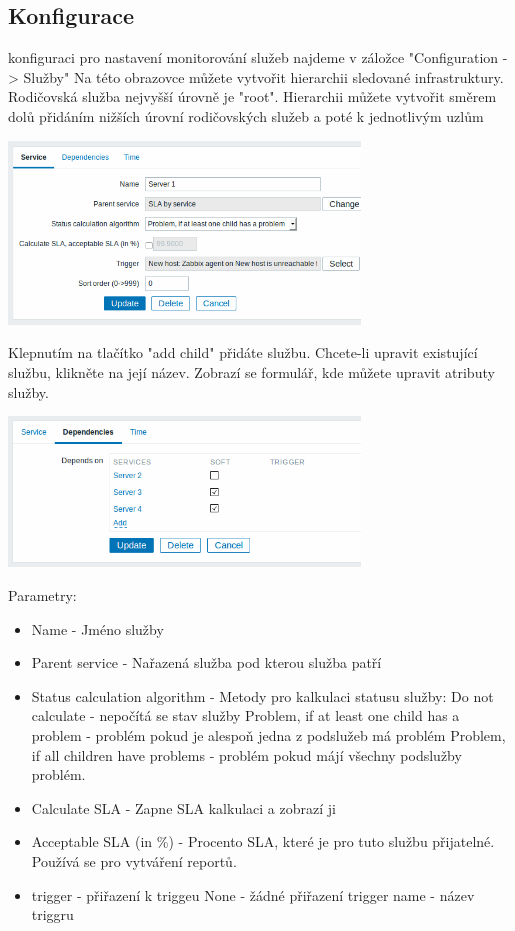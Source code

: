 \documentclass{article}
\begin{document}
\subsection{Konfigurace}
konfiguraci pro nastavení monitorování služeb najdeme v záložce "Configuration -> Služby"
Na této obrazovce můžete vytvořit hierarchii sledované infrastruktury. Rodičovská služba nejvyšší úrovně je "root". Hierarchii můžete vytvořit směrem dolů přidáním nižších úrovní rodičovských služeb a poté k jednotlivým uzlům
\begin{center}
        \includegraphics[width=0.7\textwidth]{obrazky/itservice.png}
\end{center}
Klepnutím na tlačítko "add child" přidáte službu. Chcete-li upravit existující službu, klikněte na její název. Zobrazí se formulář, kde můžete upravit atributy služby.
\begin{center}
        \includegraphics[width=0.7\textwidth]{obrazky/itservice_b.png}
\end{center}
Parametry: 
\begin{itemize}
    \item Name - Jméno služby
    \item Parent service - Nařazená služba pod kterou služba patří
    \item Status calculation algorithm - Metody pro kalkulaci statusu služby: \newline Do not calculate - nepočítá se stav služby
    \newline Problem, if at least one child has a problem  - problém pokud je alespoň jedna z podslužeb má problém
    \newline Problem, if all children have problems  - problém pokud májí všechny podslužby problém.
    \item Calculate SLA - Zapne SLA kalkulaci a zobrazí ji
    \item Acceptable SLA (in \%) - Procento SLA, které je pro tuto službu přijatelné. Používá se pro vytváření reportů.
    \item trigger - přiřazení k triggeu
    \newline None - žádné přiřazení
    \newline trigger name - název triggru
\end{itemize}
\end{document}

